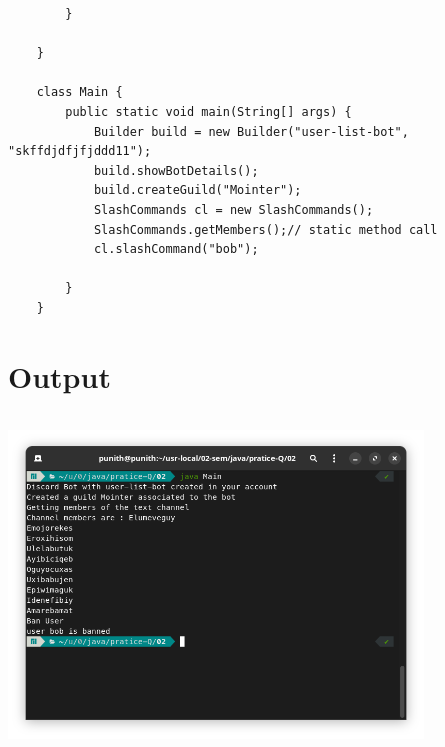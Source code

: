 \documentclass{article}
\begin{document}
\begin{lstlisting}
        }
    
    }
    
    class Main {
        public static void main(String[] args) {
            Builder build = new Builder("user-list-bot", "skffdjdfjfjddd11");
            build.showBotDetails();
            build.createGuild("Mointer");
            SlashCommands cl = new SlashCommands();
            SlashCommands.getMembers();// static method call
            cl.slashCommand("bob");
    
        }
    }
\end{lstlisting}

\section*{Output}
\includegraphics[width=11cm, height=9cm]{./images/01.png}
\end{document}
